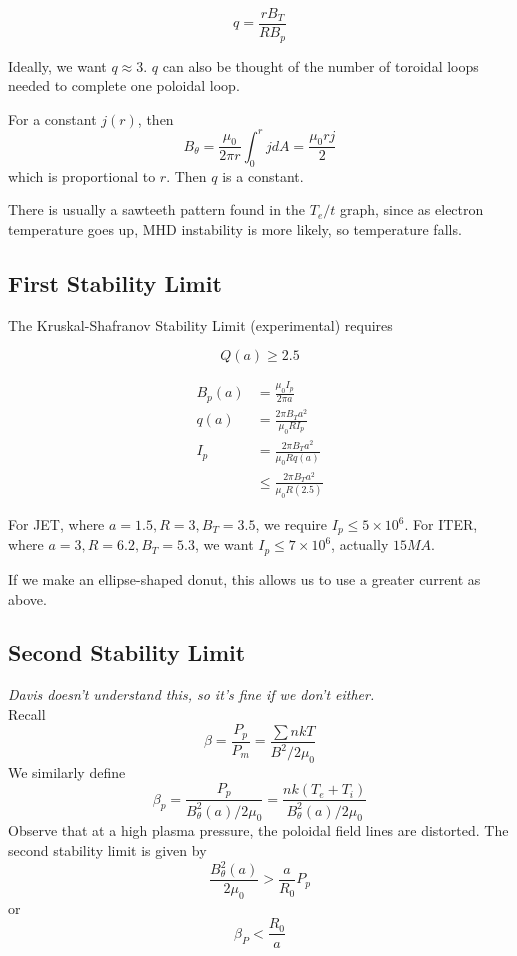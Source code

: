 \documentclass[12pt]{article}
\begin{document}
\begin{defn}
    $$q = \frac{rB_T}{RB_p}$$
\end{defn}

Ideally, we want $q \approx 3$. $q$ can also be thought of the number of toroidal loops needed to complete one poloidal loop.

\begin{ex}
    For a constant $j(r)$, then
    $$B_\theta = \frac{\mu_0}{2\pi r} \int_0^r jdA = \frac{\mu_0rj}{2}$$
    which is proportional to $r$. Then $q$ is a constant.
\end{ex}

There is usually a sawteeth pattern found in the $T_e/t$ graph, since as electron temperature goes up, MHD instability is more likely, so temperature falls.

\subsection{First Stability Limit}

The Kruskal-Shafranov Stability Limit (experimental) requires

$$Q(a) \geq 2.5$$

\begin{align*}
    B_p(a) &= \frac{\mu_0I_p}{2\pi a} \\
    q(a) &= \frac{2\pi B_Ta^2}{\mu_0RI_p} \\
    I_p &= \frac{2\pi B_Ta^2}{\mu_0Rq(a)} \\
        &\leq \frac{2\pi B_Ta^2}{\mu_0R(2.5)}
\end{align*}

\begin{ex}
    For JET, where $a = 1.5, R = 3, B_T = 3.5$, we require $I_p \leq 5 \times 10^6$. For ITER, where $a = 3, R = 6.2, B_T = 5.3$, we want $I_p \leq 7 \times 10^6$, actually $15\unit{MA}$.
\end{ex}

If we make an ellipse-shaped donut, this allows us to use a greater current as above.

\subsection{Second Stability Limit}

\textit{Davis doesn't understand this, so it's fine if we don't either.} \\
Recall
$$\beta = \frac{P_p}{P_m} = \frac{\sum nkT}{B^2/2\mu_0}$$
We similarly define
$$\beta_p = \frac{P_p}{B_\theta^2(a)/2\mu_0} = \frac{nk(T_e+T_i)}{B_\theta^2(a)/2\mu_0}$$
Observe that at a high plasma pressure, the poloidal field lines are distorted. The second stability limit is given by
$$\frac{B_\theta^2(a)}{2\mu_0} > \frac{a}{R_0} P_p$$
or
$$\beta_P < \frac{R_0}{a}$$
\end{document}
